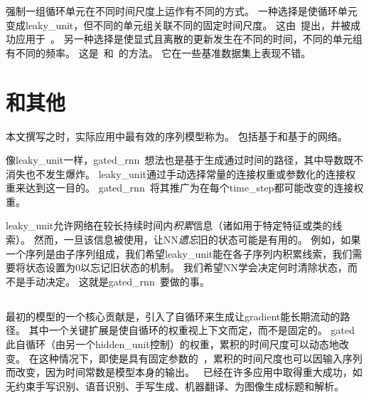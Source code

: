 
强制一组循环单元在不同时间尺度上运作有不同的方式。
一种选择是使循环单元变成\gls{leaky_unit}，但不同的单元组关联不同的固定时间尺度。
这由~\cite{Mozer-nips92}提出，并被成功应用于~\cite{Pascanu+al-ICML2013-small}。
另一种选择是使显式且离散的更新发生在不同的时间，不同的单元组有不同的频率。
这是~\cite{ElHihi+Bengio-nips8}和~\cite{Koutnik-et-al-ICML2014}的方法。
它在一些基准数据集上表现不错。

\section{和其他}
\label{sec:the_long_short_term_memory_and_other_gated_rnns}
本文撰写之时，实际应用中最有效的序列模型称为。
包括基于和基于的网络。

像\gls{leaky_unit}一样，\gls{gated_rnn}~想法也是基于生成通过时间的路径，其中导数既不消失也不发生爆炸。
\gls{leaky_unit}通过手动选择常量的连接权重或参数化的连接权重来达到这一目的。
\gls{gated_rnn}~将其推广为在每个\gls{time_step}都可能改变的连接权重。

\gls{leaky_unit}允许网络在较长持续时间内\emph{积累}信息（诸如用于特定特征或类的线索）。
然而，一旦该信息被使用，让\gls{NN}\emph{遗忘}旧的状态可能是有用的。
例如，如果一个序列是由子序列组成，我们希望\gls{leaky_unit}能在各子序列内积累线索，我们需要将状态设置为0以忘记旧状态的机制。
我们希望\gls{NN}学会决定何时清除状态，而不是手动决定。
这就是\gls{gated_rnn}~要做的事。

\subsection{}
\label{sec:lstm}
最初的模型\citep{Hochreiter+Schmidhuber-1997}的一个核心贡献是，引入了自循环来生成让\gls{gradient}能长期流动的路径。
其中一个关键扩展是使自循环的权重视上下文而定，而不是固定的\citep{Gers-et-al-2000}。
\gls{gated}此自循环（由另一个\gls{hidden_unit}控制）的权重，累积的时间尺度可以动态地改变。
在这种情况下，即使是具有固定参数的~，累积的时间尺度也可以因输入序列而改变，因为时间常数是模型本身的输出。
~已经在许多应用中取得重大成功，如无约束手写识别\citep{Graves-et-al-2009}、语音识别\citep{Graves-et-al-ICASSP2013,Graves+Jaitly-ICML2014}、手写生成\citep{Graves-arxiv2013}、机器翻译\citep{Sutskever-et-al-NIPS2014}、为图像生成标题\citep{Kiros-et-al-arxiv2014,Vinyals-et-al-arxiv2014,Xu-et-al-ICML2015}和解析\citep{Vinyals2014}。


